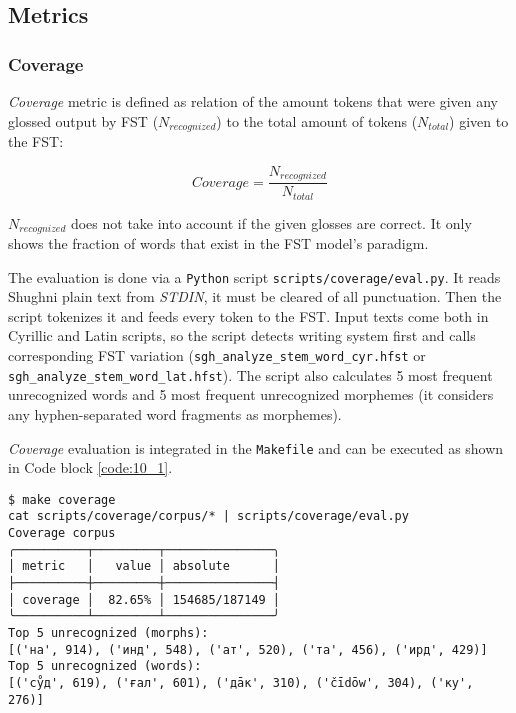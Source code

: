 \subsection{Metrics} \label{metrics_section}
\subsubsection*{Coverage}
\textit{Coverage} metric is defined as relation of the amount tokens that were given any glossed output by FST ($N_{recognized}$) to the total amount of tokens ($N_{total}$) given to the FST:

\[Coverage = \frac{N_{recognized}}{N_{total}}\]

$N_{recognized}$ does not take into account if the given glosses are correct. It only shows the fraction of words that exist in the FST model's paradigm. 

The evaluation is done via a \texttt{Python} script \texttt{scripts/coverage/eval.py}. It reads Shughni plain text from \textit{STDIN}, it must be cleared of all punctuation. Then the script tokenizes it and feeds every token to the FST. Input texts come both in Cyrillic and Latin scripts, so the script detects writing system first and calls corresponding FST variation (\texttt{sgh\_analyze\_stem\_word\_cyr.hfst} or \texttt{sgh\_analyze\_stem\_word\_lat.hfst}). The script also calculates 5 most frequent unrecognized words and 5 most frequent unrecognized morphemes (it considers any hyphen-separated word fragments as morphemes).

\textit{Coverage} evaluation is integrated in the \texttt{Makefile} and can be executed as shown in Code block \ref{code:10_1}.

\begin{code_frame}[float,floatplacement=!htbp]
    \begin{footnotesize}
    \begin{verbatim}
$ make coverage 
cat scripts/coverage/corpus/* | scripts/coverage/eval.py
Coverage corpus
╭──────────┬─────────┬───────────────╮
│ metric   │   value │ absolute      │
├──────────┼─────────┼───────────────┤
│ coverage │  82.65% │ 154685/187149 │
╰──────────┴─────────┴───────────────╯
Top 5 unrecognized (morphs):
[('на', 914), ('инд', 548), ('ат', 520), ('та', 456), ('ирд', 429)]
Top 5 unrecognized (words):
[('су̊д', 619), ('ғал', 601), ('дāк', 310), ('čīdōw', 304), ('ку', 276)]
    \end{verbatim}
    \end{footnotesize}
    \tcblower
    \label{code:10_1}
\end{code_frame}

